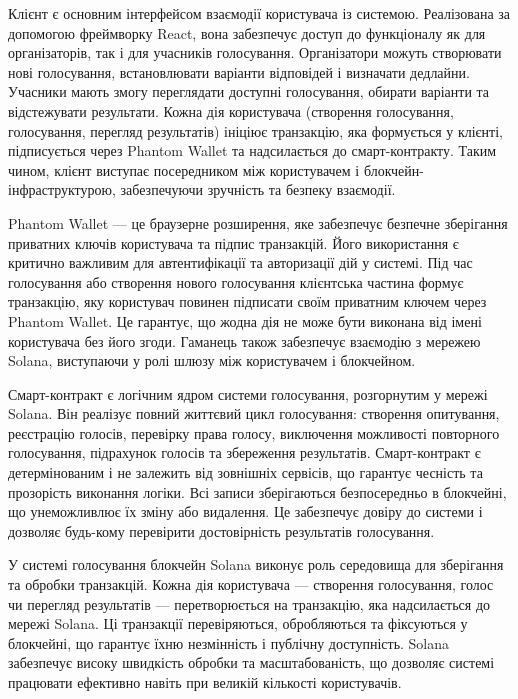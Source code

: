 \documentclass[14pt]{extreport}
\begin{document}
  Клієнт є основним інтерфейсом взаємодії користувача із системою. Реалізована за допомогою фреймворку React, вона забезпечує доступ до функціоналу як для організаторів, так і для учасників голосування. Організатори можуть створювати нові голосування, встановлювати варіанти відповідей і визначати дедлайни. Учасники мають змогу переглядати доступні голосування, обирати варіанти та відстежувати результати. Кожна дія користувача (створення голосування, голосування, перегляд результатів) ініціює транзакцію, яка формується у клієнті, підписується через Phantom Wallet та надсилається до смарт-контракту. Таким чином, клієнт виступає посередником між користувачем і блокчейн-інфраструктурою, забезпечуючи зручність та безпеку взаємодії.

  Phantom Wallet — це браузерне розширення, яке забезпечує безпечне зберігання приватних ключів користувача та підпис транзакцій. Його використання є критично важливим для автентифікації та авторизації дій у системі. Під час голосування або створення нового голосування клієнтська частина формує транзакцію, яку користувач повинен підписати своїм приватним ключем через Phantom Wallet. Це гарантує, що жодна дія не може бути виконана від імені користувача без його згоди. Гаманець також забезпечує взаємодію з мережею Solana, виступаючи у ролі шлюзу між користувачем і блокчейном.

  Смарт-контракт є логічним ядром системи голосування, розгорнутим у мережі Solana. Він реалізує повний життєвий цикл голосування: створення опитування, реєстрацію голосів, перевірку права голосу, виключення можливості повторного голосування, підрахунок голосів та збереження результатів. Смарт-контракт є детермінованим і не залежить від зовнішніх сервісів, що гарантує чесність та прозорість виконання логіки. Всі записи зберігаються безпосередньо в блокчейні, що унеможливлює їх зміну або видалення. Це забезпечує довіру до системи і дозволяє будь-кому перевірити достовірність результатів голосування.

  У системі голосування блокчейн Solana виконує роль середовища для зберігання та обробки транзакцій. Кожна дія користувача — створення голосування, голос чи перегляд результатів — перетворюється на транзакцію, яка надсилається до мережі Solana. Ці транзакції перевіряються, обробляються та фіксуються у блокчейні, що гарантує їхню незмінність і публічну доступність. Solana забезпечує високу швидкість обробки та масштабованість, що дозволяє системі працювати ефективно навіть при великій кількості користувачів.
\end{document}
